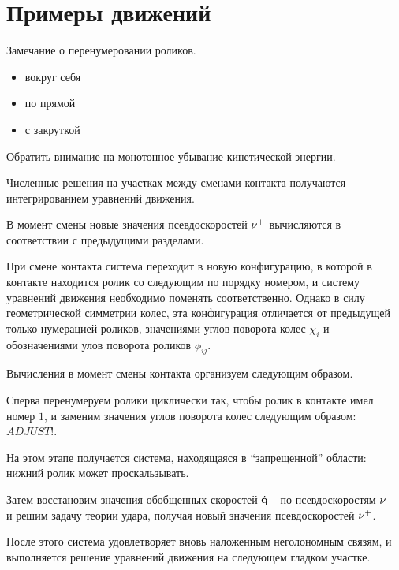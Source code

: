 
\section{Примеры движений}

Замечание о перенумеровании роликов.
\begin{itemize}
    \item вокруг себя
    \item по прямой
    \item с закруткой
\end{itemize}

Обратить внимание на монотонное убывание кинетической энергии.

Численные решения на участках между сменами контакта получаются интегрированием уравнений движения.

В момент смены новые значения псевдоскоростей $\mathbf{\nu}^+$ вычисляются в соответствии с предыдущими разделами.

При смене контакта система переходит в новую конфигурацию, в которой в контакте находится ролик со следующим по порядку номером, и систему уравнений движения необходимо поменять соответственно. Однако в силу геометрической симметрии колес, эта конфигурация отличается от предыдущей только нумерацией роликов, значениями углов поворота колес $\chi_i$ и обозначениями улов поворота роликов $\phi_{ij}$.

Вычисления в момент смены контакта организуем следующим образом.

Сперва перенумеруем ролики циклически так, чтобы ролик в контакте имел номер $1$, и заменим значения углов поворота колес следующим образом: $ADJUST!$.

На этом этапе получается система, находящаяся в ``запрещенной'' области: нижний ролик может проскальзывать.

Затем восстановим значения обобщенных скоростей $\dot{\mathbf{q}}^-$ по псевдоскоростям $\mathbf{\nu}^-$ и решим задачу теории удара, получая новый значения псевдоскоростей $\mathbf{\nu}^+$.

После этого система удовлетворяет вновь наложенным неголономным связям, и выполняется решение уравнений движения на следующем гладком участке.